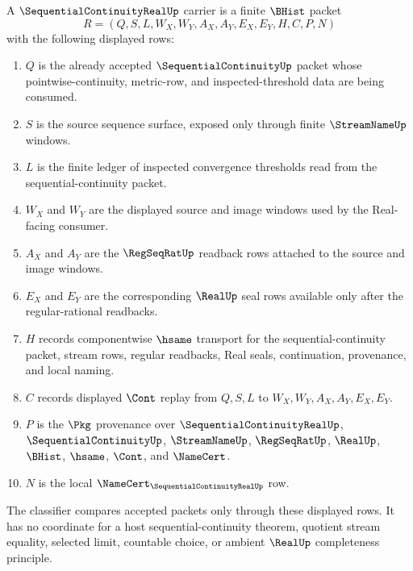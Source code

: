 \begin{definition}
\label{def:sequential-continuity-real-carrier}
A $\SequentialContinuityRealUp$ carrier is a finite $\BHist$ packet
$$
R=(Q,S,L,W_X,W_Y,A_X,A_Y,E_X,E_Y,H,C,P,N)
$$
with the following displayed rows:
\begin{enumerate}
\item $Q$ is the already accepted $\SequentialContinuityUp$ packet whose pointwise-continuity, metric-row, and inspected-threshold data are being consumed.
\item $S$ is the source sequence surface, exposed only through finite $\StreamNameUp$ windows.
\item $L$ is the finite ledger of inspected convergence thresholds read from the sequential-continuity packet.
\item $W_X$ and $W_Y$ are the displayed source and image windows used by the Real-facing consumer.
\item $A_X$ and $A_Y$ are the $\RegSeqRatUp$ readback rows attached to the source and image windows.
\item $E_X$ and $E_Y$ are the corresponding $\RealUp$ seal rows available only after the regular-rational readbacks.
\item $H$ records componentwise $\hsame$ transport for the sequential-continuity packet, stream rows, regular readbacks, Real seals, continuation, provenance, and local naming.
\item $C$ records displayed $\Cont$ replay from $Q,S,L$ to $W_X,W_Y,A_X,A_Y,E_X,E_Y$.
\item $P$ is the $\Pkg$ provenance over $\SequentialContinuityRealUp$, $\SequentialContinuityUp$, $\StreamNameUp$, $\RegSeqRatUp$, $\RealUp$, $\BHist$, $\hsame$, $\Cont$, and $\NameCert$.
\item $N$ is the local $\NameCert_{\SequentialContinuityRealUp}$ row.
\end{enumerate}
The classifier compares accepted packets only through these displayed rows. It has no coordinate for a host sequential-continuity theorem, quotient stream equality, selected limit, countable choice, or ambient $\RealUp$ completeness principle.
\end{definition}

